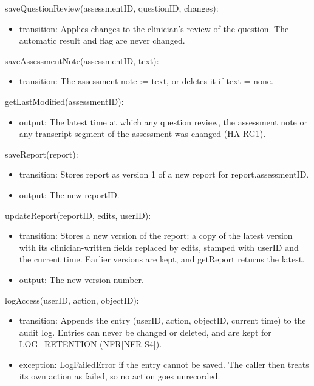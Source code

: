 \documentclass[12pt, titlepage]{article}
\newcommand{\srsref}[2]{\href{https://github.com/Nour-Fawaz/MacaBoca/blob/main/pdfs/SRS/SRS.pdf}{#1\ref*{#2}}}
\newcommand{\hazref}[1]{\href{https://github.com/Nour-Fawaz/MacaBoca/blob/main/pdfs/HazardAnalysis/HazardAnalysis.pdf}{#1}}
\begin{document}
\noindent saveQuestionReview(assessmentID, questionID, changes):
\begin{itemize}
\item transition: Applies changes to the clinician's review of the question. The automatic result and flag are never changed.
\end{itemize}

\noindent saveAssessmentNote(assessmentID, text):
\begin{itemize}
\item transition: The assessment note := text, or deletes it if text = none.
\end{itemize}

\noindent getLastModified(assessmentID):
\begin{itemize}
\item output: The latest time at which any question review, the assessment note or any transcript segment of the assessment was changed (\hazref{HA-RG1}).
\end{itemize}

\noindent saveReport(report):
\begin{itemize}
\item transition: Stores report as version 1 of a new report for report.assessmentID.
\item output: The new reportID.
\end{itemize}

\noindent updateReport(reportID, edits, userID):
\begin{itemize}
\item transition: Stores a new version of the report: a copy of the latest version with its clinician-written fields replaced by edits, stamped with userID and the current time. Earlier versions are kept, and getReport returns the latest.
\item output: The new version number.
\end{itemize}

\noindent logAccess(userID, action, objectID):
\begin{itemize}
\item transition: Appends the entry (userID, action, objectID, current time) to the audit log. Entries can never be changed or deleted, and are kept for LOG\_RETENTION (\srsref{NFR}{NFR-S4}).
\item exception: LogFailedError if the entry cannot be saved. The caller then treats its own action as failed, so no action goes unrecorded.
\end{itemize}
\end{document}
